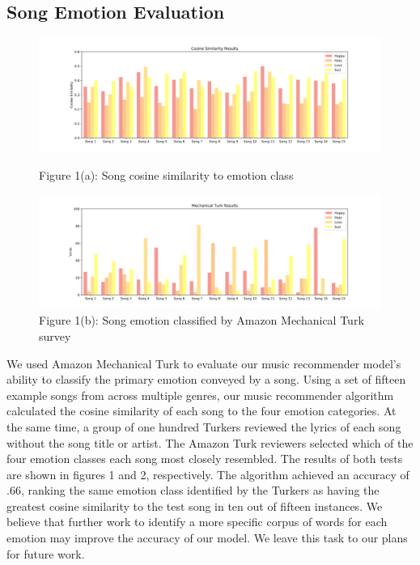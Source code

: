 \documentclass[10pt,twocolumn]{article}
\begin{document}
\subsection{Song Emotion Evaluation}
\begin{figure}[!ht]
\centering
\includegraphics[width=500pt]{test_cos.png}
\caption{Figure 1(a): Song cosine similarity to emotion class}
\label{fig:digraph}
\centering
\includegraphics[width=500pt]{test_vote.png}
\caption{Figure 1(b): Song emotion classified by Amazon Mechanical Turk survey}
\label{fig:digraph}
\end{figure}

We used Amazon Mechanical Turk to evaluate our music recommender model's ability to classify the primary emotion conveyed by a song. Using a set of fifteen example songs from across multiple genres, our music recommender algorithm calculated the cosine similarity of each song to the four emotion categories. At the same time, a group of one hundred Turkers reviewed the lyrics of each song without the song title or artist.  The Amazon Turk reviewers selected which of the four emotion classes each song most closely resembled. The results of both tests are shown in figures 1 and 2, respectively. The algorithm achieved an accuracy of .66, ranking the same emotion class identified by the Turkers as having the greatest cosine similarity to the test song in ten out of fifteen instances.  We believe that further work to identify a more specific corpus of words for each emotion may improve the accuracy of our model.  We leave this task to our plans for future work.
\end{document}
